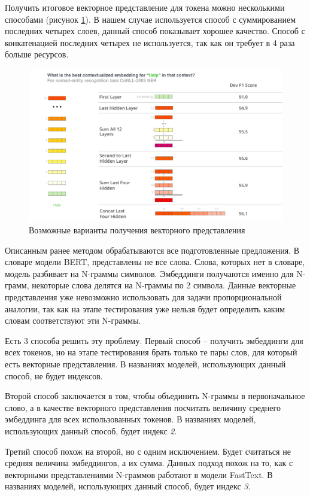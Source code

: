 \documentclass[a4paper,14pt]{article}
\begin{document}
Получить итоговое векторное представление для токена можно несколькими способами (рисунок \ref{fig:dif_vars_get_v}).
В нашем случае используется способ с суммированием последних четырех слоев, данный способ показывает хорошее качество.
Способ с конкатенацией последних четырех не используется, так как он требует в 4 раза больше ресурсов.

\begin{figure}[H]
	\centering
	\includegraphics[width=0.6\linewidth]{image/irvrsv9mefroz7io6ilnjng3fo4}
	\caption{Возможные варианты получения векторного представления}
	\label{fig:dif_vars_get_v}
\end{figure}

Описанным ранее методом обрабатываются все подготовленные предложения.
В словаре модели BERT, представлены не все слова.
Слова, которых нет в словаре, модель разбивает на N-граммы символов.
Эмбеддинги получаются именно для N-грамм, некоторые слова делятся на N-граммы по 2 символа.
Данные векторные представления уже невозможно использовать для задачи пропорциональной аналогии, так как на этапе тестирования уже нельзя будет определить каким словам соответствуют эти N-граммы.

Есть 3 способа решить эту проблему.
Первый способ -- получить эмбеддинги для всех токенов, но на этапе тестирования брать только те пары слов, для который есть векторные представления.
В названиях моделей, использующих данный способ, не будет индексов.

Второй способ заключается в том, чтобы объединить N-граммы в первоначальное слово, а в качестве векторного представления посчитать величину среднего эмбеддинга для всех использованных токенов.
В названиях моделей, использующих данный способ, будет индекс \textit{2}.

Третий способ похож на второй, но с одним исключением.
Будет считаться не средняя величина эмбеддингов, а их сумма.
Данных подход похож на то, как с векторными представлениями N-граммов работают в модели FastText.
В названиях моделей, использующих данный способ, будет индекс \textit{3}.
\end{document}
